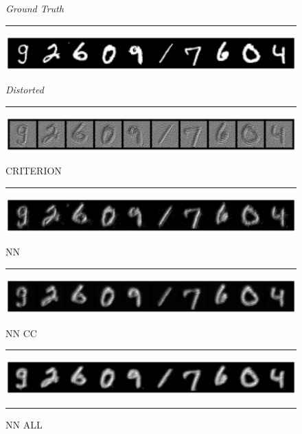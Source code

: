 \begin{figure}[h]
{
    \centering
    \setlength{\abovecaptionskip}{0pt plus 0pt minus 0pt}
    \setlength{\belowcaptionskip}{10pt plus 0pt minus 0pt}
    
    \caption*{\normalsize{\textit{Ground Truth}}}
    \rule{0.4\textwidth}{.4pt}
    
    \centerline{\hspace*{8mm}\includegraphics[width=1.4\textwidth]{figures/reconstruction_MNIST_ground_truth.png}}
    \caption*{\normalsize{\textit{Distorted}}}
    \rule{0.4\textwidth}{.4pt}
    
    \centerline{\hspace*{8mm}\includegraphics[width=1.4\textwidth]{figures/reconstruction_MNIST_distorted.png}}
    \caption*{\normalsize{CRITERION}}
    \rule{0.4\textwidth}{.4pt}
    
    \centerline{\hspace*{8mm}\includegraphics[width=1.4\textwidth]{figures/reconstruction_MNIST_CRITERION_epoch_100.png}}
    \caption*{\normalsize{NN}}
    \rule{0.4\textwidth}{.4pt}
    
    \centerline{\hspace*{8mm}\includegraphics[width=1.4\textwidth]{figures/reconstruction_MNIST_NN_epoch_100.png}}
    \caption*{\normalsize{NN CC}}
    \rule{0.4\textwidth}{.4pt}
    
    \centerline{\hspace*{8mm}\includegraphics[width=1.4\textwidth]{figures/reconstruction_MNIST_NN_CC_epoch_100.png}}
    \caption*{\normalsize{NN ALL}}
    \rule{0.4\textwidth}{.4pt}
    
}
\end{figure}
